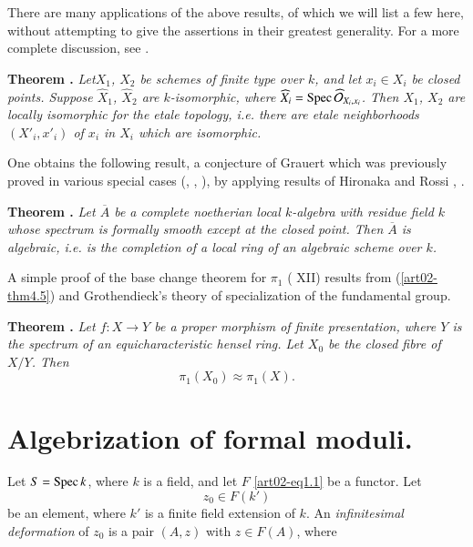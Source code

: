 There are many applications of the above results, of which we will list a few here, without attempting to give the assertions in their greatest generality. For a more complete discussion, see \cite{art02-key4}.

\medskip
\noindent
{\bf Theorem .\label{art02-thm4.6}}
{\em Let\pageoriginale $X_{1}$, $X_{2}$ be schemes of finite type over $k$, and let $x_{i}\in X_{i}$ be closed points. Suppose $\widehat{X}_{1}$, $\widehat{X}_{2}$ are $k$-isomorphic, where $\widehat{X}_{i}=\operatorname{Spec} \widehat{\mathcal{O}}_{X_{i},x_{i}}$. Then $X_{1}$, $X_{2}$ are locally isomorphic for the etale topology, i.e. there are etale neighborhoods $(X'_{i},x'_{i})$ of $x_{i}$ in $X_{i}$ which are isomorphic.}
\smallskip

One obtains the following result, a conjecture of Grauert which was previously proved in various special cases (\cite{art02-key31}, \cite{art02-key17}, \cite{art02-key2}), by applying results of Hironaka and Rossi \cite{art02-key18}, \cite{art02-key15}.

\medskip
\noindent
{\bf Theorem .\label{art02-thm4.7}}
{\em Let $\overline{A}$ be a complete noetherian local $k$-algebra with residue field $k$ whose spectrum is formally smooth except at the closed point. Then $\overline{A}$ is algebraic, i.e. is the completion of a local ring of an algebraic scheme over $k$.}
\smallskip

A simple proof of the base change theorem for $\pi_{1}$ (\cite{art02-key6} XII) results from (\ref{art02-thm4.5}) and Grothendieck's theory of specialization of the fundamental group.

\medskip
\noindent
{\bf Theorem .\label{art02-thm4.8}}
{\em Let $f:X\to Y$ be a proper morphism of finite presentation, where $Y$ is the spectrum of an equicharacteristic hensel ring. Let $X_{0}$ be the closed fibre of $X/Y$. Then}
$$
\pi_{1}(X_{0})\approx \pi_{1}(X).
$$


\section{Algebrization of formal moduli.}\label{art02-sec5}

Let $S=\operatorname{Spec} k$, where $k$ is a field, and let $F$ \eqref{art02-eq1.1} be a functor. Let
$$
z_{0}\in F(k')
$$
be an element, where $k'$ is a finite field extension of $k$. An {\em infinitesimal deformation} of $z_{0}$ is a pair $(A,z)$ with $z\in F(A)$, where

